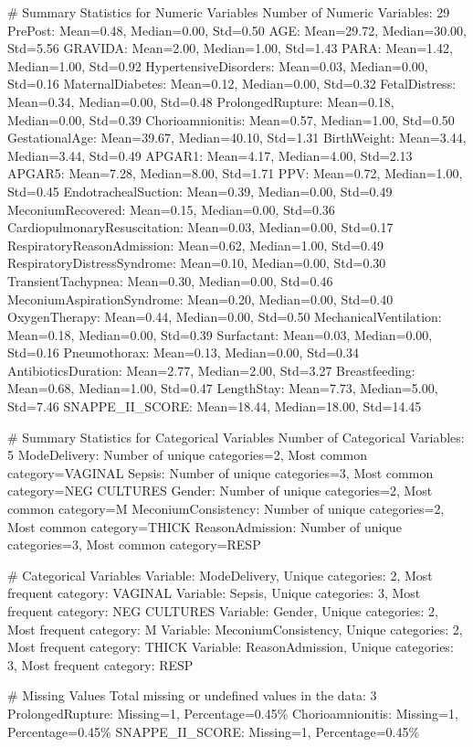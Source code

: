 \documentclass[11pt]{article}
\begin{document}
\begin{codeoutput}
\# Summary Statistics for Numeric Variables
Number of Numeric Variables: 29
PrePost: Mean=0.48, Median=0.00, Std=0.50
AGE: Mean=29.72, Median=30.00, Std=5.56
GRAVIDA: Mean=2.00, Median=1.00, Std=1.43
PARA: Mean=1.42, Median=1.00, Std=0.92
HypertensiveDisorders: Mean=0.03, Median=0.00, Std=0.16
MaternalDiabetes: Mean=0.12, Median=0.00, Std=0.32
FetalDistress: Mean=0.34, Median=0.00, Std=0.48
ProlongedRupture: Mean=0.18, Median=0.00, Std=0.39
Chorioamnionitis: Mean=0.57, Median=1.00, Std=0.50
GestationalAge: Mean=39.67, Median=40.10, Std=1.31
BirthWeight: Mean=3.44, Median=3.44, Std=0.49
APGAR1: Mean=4.17, Median=4.00, Std=2.13
APGAR5: Mean=7.28, Median=8.00, Std=1.71
PPV: Mean=0.72, Median=1.00, Std=0.45
EndotrachealSuction: Mean=0.39, Median=0.00, Std=0.49
MeconiumRecovered: Mean=0.15, Median=0.00, Std=0.36
CardiopulmonaryResuscitation: Mean=0.03, Median=0.00, Std=0.17
RespiratoryReasonAdmission: Mean=0.62, Median=1.00, Std=0.49
RespiratoryDistressSyndrome: Mean=0.10, Median=0.00, Std=0.30
TransientTachypnea: Mean=0.30, Median=0.00, Std=0.46
MeconiumAspirationSyndrome: Mean=0.20, Median=0.00, Std=0.40
OxygenTherapy: Mean=0.44, Median=0.00, Std=0.50
MechanicalVentilation: Mean=0.18, Median=0.00, Std=0.39
Surfactant: Mean=0.03, Median=0.00, Std=0.16
Pneumothorax: Mean=0.13, Median=0.00, Std=0.34
AntibioticsDuration: Mean=2.77, Median=2.00, Std=3.27
Breastfeeding: Mean=0.68, Median=1.00, Std=0.47
LengthStay: Mean=7.73, Median=5.00, Std=7.46
SNAPPE\_II\_SCORE: Mean=18.44, Median=18.00, Std=14.45

\# Summary Statistics for Categorical Variables
Number of Categorical Variables: 5
ModeDelivery: Number of unique categories=2, Most common category=VAGINAL
Sepsis: Number of unique categories=3, Most common category=NEG CULTURES
Gender: Number of unique categories=2, Most common category=M
MeconiumConsistency: Number of unique categories=2, Most common category=THICK
ReasonAdmission: Number of unique categories=3, Most common category=RESP

\# Categorical Variables
Variable: ModeDelivery, Unique categories: 2, Most frequent category: VAGINAL
Variable: Sepsis, Unique categories: 3, Most frequent category: NEG CULTURES
Variable: Gender, Unique categories: 2, Most frequent category: M
Variable: MeconiumConsistency, Unique categories: 2, Most frequent category: THICK
Variable: ReasonAdmission, Unique categories: 3, Most frequent category: RESP

\# Missing Values
Total missing or undefined values in the data: 3
ProlongedRupture: Missing=1, Percentage=0.45\%
Chorioamnionitis: Missing=1, Percentage=0.45\%
SNAPPE\_II\_SCORE: Missing=1, Percentage=0.45\%

\end{codeoutput}
\end{document}
